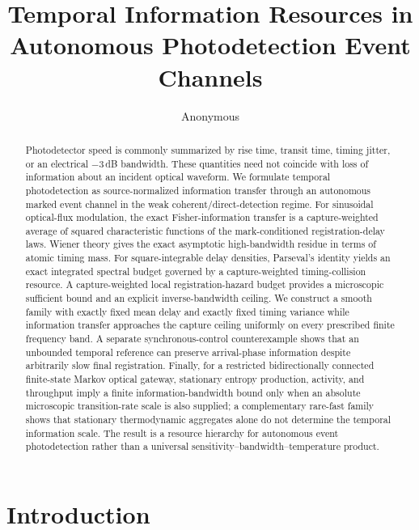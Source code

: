 \documentclass[aps,prapplied,preprint,nofootinbib]{revtex4-2}
\begin{document}
\title{Temporal Information Resources in Autonomous Photodetection Event Channels}
\author{Anonymous}

\begin{abstract}
Photodetector speed is commonly summarized by rise time, transit time, timing jitter, or an electrical $-3\,$dB bandwidth. These quantities need not coincide with loss of information about an incident optical waveform. We formulate temporal photodetection as source-normalized information transfer through an autonomous marked event channel in the weak coherent/direct-detection regime. For sinusoidal optical-flux modulation, the exact Fisher-information transfer is a capture-weighted average of squared characteristic functions of the mark-conditioned registration-delay laws. Wiener theory gives the exact asymptotic high-bandwidth residue in terms of atomic timing mass. For square-integrable delay densities, Parseval's identity yields an exact integrated spectral budget governed by a capture-weighted timing-collision resource. A capture-weighted local registration-hazard budget provides a microscopic sufficient bound and an explicit inverse-bandwidth ceiling. We construct a smooth family with exactly fixed mean delay and exactly fixed timing variance while information transfer approaches the capture ceiling uniformly on every prescribed finite frequency band. A separate synchronous-control counterexample shows that an unbounded temporal reference can preserve arrival-phase information despite arbitrarily slow final registration. Finally, for a restricted bidirectionally connected finite-state Markov optical gateway, stationary entropy production, activity, and throughput imply a finite information-bandwidth bound only when an absolute microscopic transition-rate scale is also supplied; a complementary rare-fast family shows that stationary thermodynamic aggregates alone do not determine the temporal information scale. The result is a resource hierarchy for autonomous event photodetection rather than a universal sensitivity--bandwidth--temperature product.
\end{abstract}

\maketitle

\section{Introduction}
\end{document}
